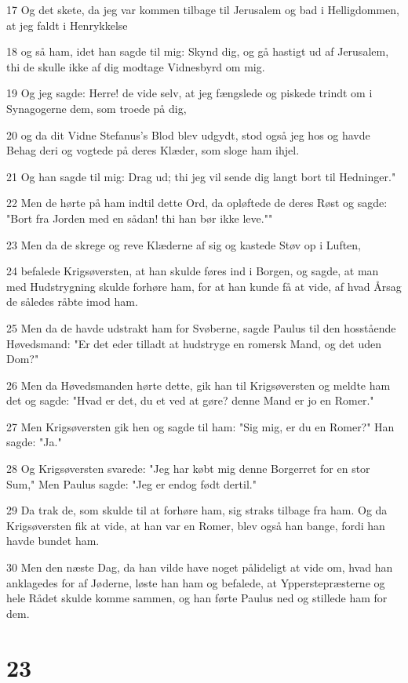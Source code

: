 \par 17 Og det skete, da jeg var kommen tilbage til Jerusalem og bad i Helligdommen, at jeg faldt i Henrykkelse
\par 18 og så ham, idet han sagde til mig: Skynd dig, og gå hastigt ud af Jerusalem, thi de skulle ikke af dig modtage Vidnesbyrd om mig.
\par 19 Og jeg sagde: Herre! de vide selv, at jeg fængslede og piskede trindt om i Synagogerne dem, som troede på dig,
\par 20 og da dit Vidne Stefanus's Blod blev udgydt, stod også jeg hos og havde Behag deri og vogtede på deres Klæder, som sloge ham ihjel.
\par 21 Og han sagde til mig: Drag ud; thi jeg vil sende dig langt bort til Hedninger."
\par 22 Men de hørte på ham indtil dette Ord, da opløftede de deres Røst og sagde: "Bort fra Jorden med en sådan! thi han bør ikke leve.""
\par 23 Men da de skrege og reve Klæderne af sig og kastede Støv op i Luften,
\par 24 befalede Krigsøversten, at han skulde føres ind i Borgen, og sagde, at man med Hudstrygning skulde forhøre ham, for at han kunde få at vide, af hvad Årsag de således råbte imod ham.
\par 25 Men da de havde udstrakt ham for Svøberne, sagde Paulus til den hosstående Høvedsmand: "Er det eder tilladt at hudstryge en romersk Mand, og det uden Dom?"
\par 26 Men da Høvedsmanden hørte dette, gik han til Krigsøversten og meldte ham det og sagde: "Hvad er det, du et ved at gøre? denne Mand er jo en Romer."
\par 27 Men Krigsøversten gik hen og sagde til ham: "Sig mig, er du en Romer?" Han sagde: "Ja."
\par 28 Og Krigsøversten svarede: "Jeg har købt mig denne Borgerret for en stor Sum," Men Paulus sagde: "Jeg er endog født dertil."
\par 29 Da trak de, som skulde til at forhøre ham, sig straks tilbage fra ham. Og da Krigsøversten fik at vide, at han var en Romer, blev også han bange, fordi han havde bundet ham.
\par 30 Men den næste Dag, da han vilde have noget pålideligt at vide om, hvad han anklagedes for af Jøderne, løste han ham og befalede, at Ypperstepræsterne og hele Rådet skulde komme sammen, og han førte Paulus ned og stillede ham for dem.

\chapter{23}

